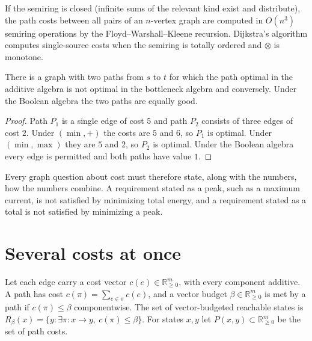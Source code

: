 \begin{established}\label{thm:lehmann}
If the semiring is closed (infinite sums of the relevant kind exist and distribute), the path costs between all pairs of an $n$-vertex graph are computed in $O(n^{3})$ semiring operations by the Floyd--Warshall--Kleene recursion. Dijkstra's algorithm computes single-source costs when the semiring is totally ordered and $\otimes$ is monotone.
\end{established}

\begin{newresult}\label{prop:algebras}
There is a graph with two paths from $s$ to $t$ for which the path optimal in the additive algebra is not optimal in the bottleneck algebra and conversely. Under the Boolean algebra the two paths are equally good.
\end{newresult}
\begin{proof}
Path $P_1$ is a single edge of cost $5$ and path $P_2$ consists of three edges of cost $2$. Under $(\min,+)$ the costs are $5$ and $6$, so $P_1$ is optimal. Under $(\min,\max)$ they are $5$ and $2$, so $P_2$ is optimal. Under the Boolean algebra every edge is permitted and both paths have value $1$.
\end{proof}

Every graph question about cost must therefore state, along with the numbers, how the numbers combine. A requirement stated as a peak, such as a maximum current, is not satisfied by minimizing total energy, and a requirement stated as a total is not satisfied by minimizing a peak.

\section{Several costs at once}

Let each edge carry a cost vector $c(e)\in\mathbb R_{\ge0}^{m}$, with every component additive. A path has cost $c(\pi)=\sum_{e\in\pi}c(e)$, and a vector budget $\beta\in\mathbb R_{\ge0}^{m}$ is met by a path if $c(\pi)\le\beta$ componentwise. The set of vector-budgeted reachable states is $R_\beta(x)=\{y:\exists\pi:x\to y,\ c(\pi)\le\beta\}$. For states $x,y$ let $P(x,y)\subset\mathbb R^m_{\ge0}$ be the set of path costs.

